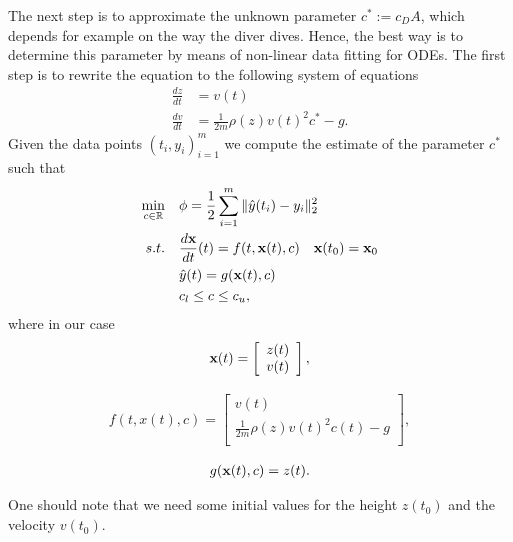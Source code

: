 The next step is to approximate the unknown parameter $c^*:=c_{D}A$, which depends for example on the way the diver dives. Hence, the best way is to determine this parameter by means of non-linear data fitting for ODEs. The first step is to rewrite the equation to the following system of equations
\begin{align*}
\frac{dz}{dt}&=v(t)\\
\frac{dv}{dt}&=\frac{1}{2m}\rho(z)v(t)^2c^*-g.
\end{align*}
Given the data points ${(t_i,y_i)}_{i=1}^m$ we compute the estimate of the parameter $c^*$ such that
\begin{align}
\underset{c\in\mathbb{R}}{\min}\quad &\phi=\frac{1}{2}\sum_{i=1}^m\Vert\hat{y}(t_i)-y_i\Vert_2^2\\
s.t.\quad &\frac{d\textbf{x}}{dt}(t)=f(t,\textbf{x}(t),c)\quad \textbf{x}(t_0)=\textbf{x}_0\\
	&\hat{y}(t)=g(\textbf{x}(t),c)\\
	&c_l\leq c\leq c_u,
\end{align}
where in our case
\begin{align*}
\textbf{x}(t)=\left[
\begin{array}{c}
z(t)\\
v(t)\\
\end{array}
\right],
\end{align*}

\begin{align*}
f(t,x(t),c)=\left[
\begin{array}{c}
v(t)\\
\frac{1}{2m}\rho(z)v(t)^2c(t)-g\\
\end{array}
\right],
\end{align*}

\begin{align*}
g(\textbf{x}(t),c)=z(t).
\end{align*}

One should note that we need some initial values for the height $z(t_0)$ and the velocity $v(t_0)$.

